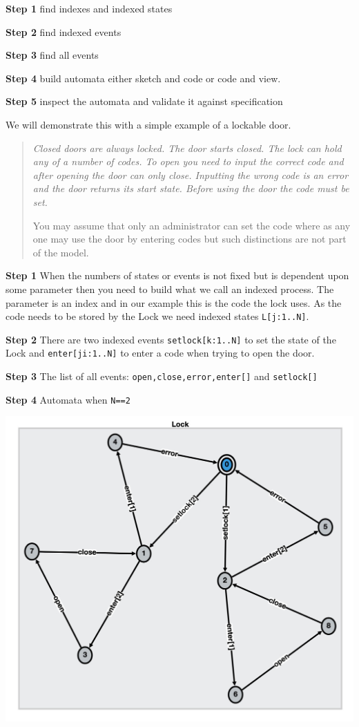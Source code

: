 \documentclass[]{article}
\begin{document}
 
 {\bf Step 1} find indexes and  indexed states 
 
 {\bf Step 2} find indexed events
 
 {\bf Step 3} find all events
 
 {\bf Step 4} build automata
either sketch and code or code and view.
 
 {\bf Step 5} inspect the automata and validate it against specification
   
\noindent We will demonstrate this with a simple example of a lockable door.

\begin{quote}
{\it Closed doors are always locked. The door starts closed. The lock can hold any of  a number of  codes.  To open you need to input the correct code and after opening the door can only close. Inputting the wrong code is an error and the door returns its start state. Before using the door the code must be set.  

You may assume that only an administrator can set the code  where as any one may use the door by entering codes but such distinctions are not part of the model. 
}
\end{quote}   
   
{\bf Step 1} When the numbers of states or events is not fixed but is dependent upon some parameter then you need to build what we call an indexed  process. The parameter is an index and in our example this is the {\sf code} the lock uses. As the code needs to be stored by the Lock we need indexed states \verb|L[j:1..N]|.

{\bf Step 2} There are two indexed events \verb|setlock[k:1..N]| to set the state of the Lock and \verb|enter[ji:1..N]| to enter a code when trying to open the door.

{\bf Step 3} The list of all events: \verb|open,close,error,enter[]| and \verb|setlock[]| 

{\bf Step 4} Automata when \verb|N==2|
 
\noindent\begin{center} \includegraphics[scale=0.24]{Lock.jpg} \end{center}
\end{document}
